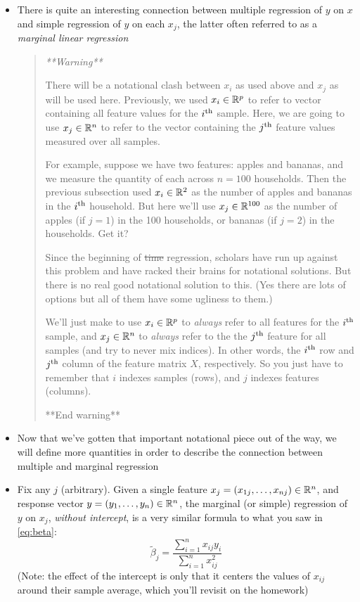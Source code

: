 \documentclass{article}
\begin{document}
\begin{itemize}
\item There is quite an interesting connection between multiple regression of
  $y$ on $x$ and simple regression of $y$ on each $x_j$, the latter often
  referred to as a \emph{marginal linear regression}

\begin{quote}\it
**Warning** 

There will be a notational clash between $x_i$ as used above and $x_j$ as will
be used here. Previously, we used $x_i \in \mathbb{R}^p$ to refer to vector containing
all feature values for the $i^{\textnormal{th}}$ sample. Here, we are going to use $x_j \in
\mathbb{R}^n$ to refer to the vector containing the $j^{\textnormal{th}}$ feature values measured over
all samples.       

For example, suppose we have two features: apples and bananas, and we measure
the quantity of each across $n = 100$ households. Then the previous subsection
used $x_i \in \mathbb{R}^2$ as the number of apples and bananas in the $i^{\textnormal{th}}$
household. But here we'll use $x_j \in \mathbb{R}^{100}$ as the number of apples (if
$j=1$) in the 100 households, or bananas (if $j=2$) in the households. Get it? 

Since the beginning of \sout{time} regression, scholars have run up against this
problem and have racked their brains for notational solutions. But there is no
real good notational solution to this. (Yes there are lots of options but all of
them have some ugliness to them.)

We'll just make to use $x_i \in \mathbb{R}^p$ to \emph{always} refer to all features for
the $i^{\textnormal{th}}$ sample, and $x_j \in \mathbb{R}^n$ to \emph{always} refer to the the $j^{\textnormal{th}}$
feature for all samples (and try to never mix indices). In other words, the
$i^{\textnormal{th}}$ row and $j^{\textnormal{th}}$ column of the feature matrix $X$, respectively. So you
just have to remember that $i$ indexes samples (rows), and $j$ indexes features
(columns). 

**End warning** 
\end{quote}

\item Now that we've gotten that important notational piece out of the way, we
  will define more quantities in order to describe the connection between
  multiple and marginal regression

\item Fix any $j$ (arbitrary). Given a single feature $x_j = (x_{1j}, \dots,
  x_{nj}) \in \mathbb{R}^n$, and response vector $y = (y_1, \dots, y_n) \in \mathbb{R}^n$, the 
  marginal (or simple) regression of $y$ on $x_j$, \emph{without intercept}, is
  a very similar formula to what you saw in \eqref{eq:beta}:
  \[
  \tilde\beta_j = \frac{\sum_{i=1}^n x_{ij} y_i}{\sum_{i=1}^n x_{ij}^2} 
  \]
  (Note: the effect of the intercept is only that it centers the values of
  $x_{ij}$ around their sample average, which you'll revisit on the homework)    


\end{itemize}
\end{document}
